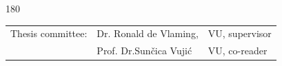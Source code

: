\begin{titlepage}
\begin{center}
\begin{textblock}{180}
\end{textblock}

\vspace{5cm}
\begin{tabular}{l l l}
    Thesis committee: & Dr. Ronald de Vlaming, & VU, supervisor \\
                      & Prof. Dr.Sunčica Vujić & VU, co-reader \\
\end{tabular}

\setlength{\parindent}{\backupparindent}
\end{center}


\end{titlepage} 